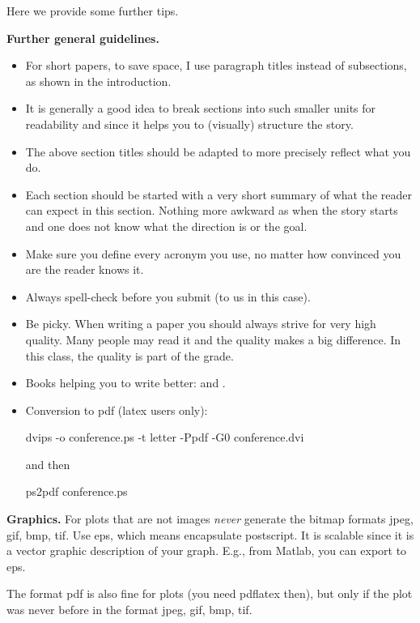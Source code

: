 \documentclass[letterpaper]{article}
\newcommand{\mypar}[1]{{\bf #1.}}
\begin{document}
Here we provide some further tips.

\mypar{Further general guidelines}

\begin{itemize}
\item For short papers, to save space, I use paragraph titles instead of
subsections, as shown in the introduction.

\item It is generally a good idea to break sections into such smaller
units for readability and since it helps you to (visually) structure the story.

\item The above section titles should be adapted to more precisely
reflect what you do.

\item Each section should be started with a very
short summary of what the reader can expect in this section. Nothing
more awkward as when the story starts and one does not know what the
direction is or the goal.

\item Make sure you define every acronym you use, no matter how
convinced you are the reader knows it.

\item Always spell-check before you submit (to us in this case).

\item Be picky. When writing a paper you should always strive for very
high quality. Many people may read it and the quality makes a big difference.
In this class, the quality is part of the grade.

\item Books helping you to write better: \cite{Higham:98} and \cite{Strunk:00}.

\item Conversion to pdf (latex users only): 

dvips -o conference.ps -t letter -Ppdf -G0 conference.dvi

and then

ps2pdf conference.ps
\end{itemize}

\mypar{Graphics} For plots that are not images {\em never} generate the bitmap formats
jpeg, gif, bmp, tif. Use eps, which means encapsulate postscript. It is
scalable since it is a vector graphic description of your graph. E.g.,
from Matlab, you can export to eps.

The format pdf is also fine for plots (you need pdflatex then), but only if the plot was never before in the format 
jpeg, gif, bmp, tif.




\end{document}
